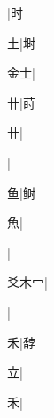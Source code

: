 \begin{multicols}{2}
{{\cjk{}{\cnsym{}　}{\cnsym{}　}{\cnsym{}　}}|{\cjk{}时}\par
{\cjk{}{\cnsym{}　}{\cnsym{}　}土}|{\cjk{}埘}\par
{\cjk{}{\cnsym{}　}金士}|{}\par
{\cjk{}{\cnsym{}　}{\cnsym{}　}卄}|{\cjk{}莳}\par
{卄}|{}\par
{}|{}\par
{\cjk{}{\cnsym{}　}{\cnsym{}　}鱼}|{\cjk{}鲥}\par
{\cjk{}{\cnsym{}　}{\cnsym{}　}魚}|{}\par
{}|{}\par
{\cjk{}爻木{\cnxHanaA{}冖}}|{}\par
{\cjk{}{\cnsym{}　}{\cnsym{}　}{\cnsym{}　}}|{}\par
{\cjk{}{\cnsym{}　}{\cnsym{}　}禾}|{\cjk{}馞}\par
{\cjk{}{\cnsym{}　}{\cnsym{}　}立}|{}\par
{\cjk{}{\cnsym{}　}{\cnsym{}　}禾}|{}\par
}
\end{multicols}
